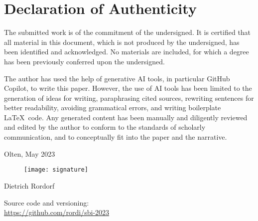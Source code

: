 \vspace*{3cm}

\section*{Declaration of Authenticity}

The submitted work is of the commitment of the undersigned. It is certified that all material
in this document, which is not produced by the undersigned, has been identified and acknowledged.
No materials are included, for which a degree has been previously conferred upon the undersigned.

\vspace*{0.5cm} 

\noindent The author has used the help of generative AI tools, in particular GitHub Copilot, to
write this paper. However, the use of AI tools has been limited to the generation of ideas for
writing, paraphrasing cited sources, rewriting sentences for better readability, avoiding grammatical
errors, and writing boilerplate \LaTeX\ code. Any generated content has been manually and diligently
reviewed and edited by the author to conform to the standards of scholarly communication, and to
conceptually fit into the paper and the narrative.

\vspace*{1cm} 
\noindent Olten, May 2023

\begin{figure}[h!]
    \texttt{[image: signature]}
\end{figure}
\noindent Dietrich Rordorf

\vspace*{2cm} 

\noindent Source code and versioning:\\
\url{https://github.com/rordi/sbi-2023}

